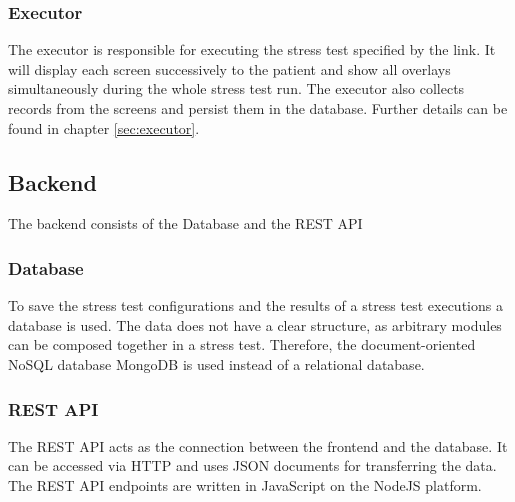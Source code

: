 \subsubsection*{Executor}
The executor is responsible for executing the stress test specified by the link.
It will display each screen successively to the patient and show all overlays simultaneously during the whole stress test run.
The executor also collects records from the screens and persist them in the database.
Further details can be found in chapter \ref{sec:executor}.

\subsection{Backend}
The backend consists of the Database and the REST API

\subsubsection*{Database}
To save the stress test configurations and the results of a stress test executions a database is used.
The data does not have a clear structure, as arbitrary modules can be composed together in a stress test.
Therefore, the document-oriented NoSQL database MongoDB is used instead of a relational database.

\subsubsection*{REST API}
The REST API acts as the connection between the frontend and the database.
It can be accessed via HTTP and uses JSON documents for transferring the data.
The REST API endpoints are written in JavaScript on the NodeJS platform.
